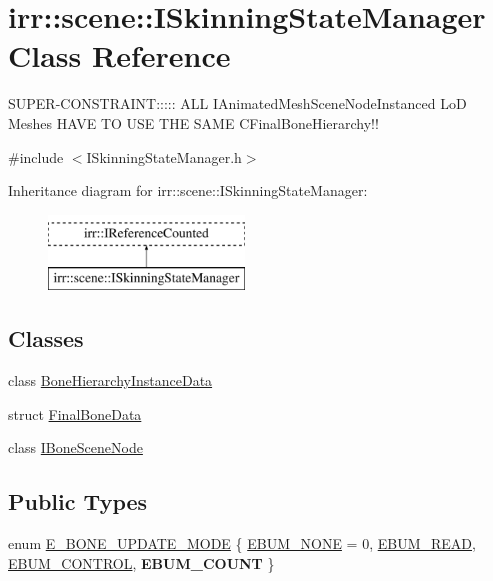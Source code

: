 \hypertarget{classirr_1_1scene_1_1ISkinningStateManager}{}\section{irr\+:\+:scene\+:\+:I\+Skinning\+State\+Manager Class Reference}
\label{classirr_1_1scene_1_1ISkinningStateManager}


S\+U\+P\+E\+R-\/\+C\+O\+N\+S\+T\+R\+A\+I\+NT\+:\+:\+:\+:\+: A\+LL I\+Animated\+Mesh\+Scene\+Node\+Instanced LoD Meshes H\+A\+VE TO U\+SE T\+HE S\+A\+ME C\+Final\+Bone\+Hierarchy!!  




{\ttfamily \#include $<$I\+Skinning\+State\+Manager.\+h$>$}

Inheritance diagram for irr\+:\+:scene\+:\+:I\+Skinning\+State\+Manager\+:\begin{figure}[H]
\begin{center}
\leavevmode
\includegraphics[height=2.000000cm]{classirr_1_1scene_1_1ISkinningStateManager}
\end{center}
\end{figure}
\subsection*{Classes}
\begin{DoxyCompactItemize}
\item 
class \hyperlink{classirr_1_1scene_1_1ISkinningStateManager_1_1BoneHierarchyInstanceData}{Bone\+Hierarchy\+Instance\+Data}
\item 
struct \hyperlink{structirr_1_1scene_1_1ISkinningStateManager_1_1FinalBoneData}{Final\+Bone\+Data}
\item 
class \hyperlink{classirr_1_1scene_1_1ISkinningStateManager_1_1IBoneSceneNode}{I\+Bone\+Scene\+Node}
\end{DoxyCompactItemize}
\subsection*{Public Types}
\begin{DoxyCompactItemize}
\item 
enum \hyperlink{classirr_1_1scene_1_1ISkinningStateManager_a78f9d8d280dc029b3637bd3a48c0c3c6}{E\+\_\+\+B\+O\+N\+E\+\_\+\+U\+P\+D\+A\+T\+E\+\_\+\+M\+O\+DE} \{ \hyperlink{classirr_1_1scene_1_1ISkinningStateManager_a78f9d8d280dc029b3637bd3a48c0c3c6af91613b0a4c9ac338de93ff48a28885c}{E\+B\+U\+M\+\_\+\+N\+O\+NE} = 0, 
\hyperlink{classirr_1_1scene_1_1ISkinningStateManager_a78f9d8d280dc029b3637bd3a48c0c3c6a250d56ffd813cdc7d28ac9ea1aef21b4}{E\+B\+U\+M\+\_\+\+R\+E\+AD}, 
\hyperlink{classirr_1_1scene_1_1ISkinningStateManager_a78f9d8d280dc029b3637bd3a48c0c3c6aea3dbe0db8e6924d226987f485166169}{E\+B\+U\+M\+\_\+\+C\+O\+N\+T\+R\+OL}, 
{\bfseries E\+B\+U\+M\+\_\+\+C\+O\+U\+NT}
 \}
\end{DoxyCompactItemize}
